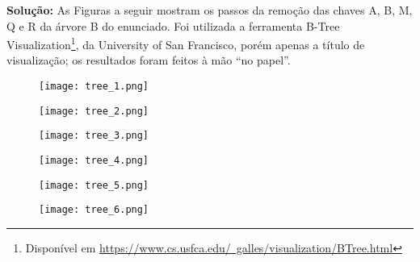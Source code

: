 \textbf{Solução:}
As Figuras a seguir mostram os passos da remoção das chaves A, B, M, Q e R da árvore B do enunciado. Foi utilizada a ferramenta B-Tree Visualization\footnote{Disponível em \href{https://www.cs.usfca.edu/~galles/visualization/BTree.html}{https://www.cs.usfca.edu/~galles/visualization/BTree.html}}, da University of San Francisco, porém apenas a título de visualização; os resultados foram feitos à mão ``no papel''.

\begin{figure}[H]
    \centering
    \texttt{[image: tree\_1.png]}
\end{figure}

\begin{figure}[H]
    \centering
    \texttt{[image: tree\_2.png]}
\end{figure}

\begin{figure}[H]
    \centering
    \texttt{[image: tree\_3.png]}
\end{figure}

\begin{figure}[H]
    \centering
    \texttt{[image: tree\_4.png]}
\end{figure}

\begin{figure}[H]
    \centering
    \texttt{[image: tree\_5.png]}
\end{figure}

\begin{figure}[H]
    \centering
    \texttt{[image: tree\_6.png]}
\end{figure}
